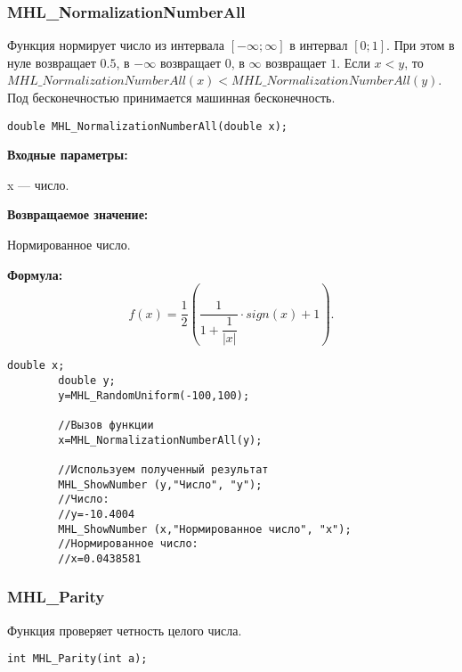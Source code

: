 \documentclass[a4paper,12pt]{article}
\begin{document}
\subsubsection{MHL\_NormalizationNumberAll}\label{MHL_NormalizationNumberAll}

Функция нормирует число из интервала $\left[-\infty;\infty \right] $ в интервал $\left[0;1\right]$. При этом в нуле возвращает $0.5$, в $-\infty$ возвращает $0$, в $\infty$ возвращает $1$. Если $x<y$, то $MHL\_NormalizationNumberAll(x)<MHL\_NormalizationNumberAll(y)$. Под бесконечностью принимается машинная бесконечность.


\begin{lstlisting}[label=code_syntax_MHL_NormalizationNumberAll,caption=Синтаксис]
double MHL_NormalizationNumberAll(double x);
\end{lstlisting}

\textbf{Входные параметры:}

 x --- число.

\textbf{Возвращаемое значение:}
 
Нормированное число.
 
\textbf{Формула:}
\begin{equation*}
f\left(x \right)=\frac{1}{2}\left( \dfrac{1}{1+\dfrac{1}{\left| x\right| }}\cdot sign \left( x\right)+1 \right) .
\end{equation*}


\begin{lstlisting}[label=code_use_MHL_NormalizationNumberAll,caption=Пример использования]
        double x;
        double y;
        y=MHL_RandomUniform(-100,100);

        //Вызов функции
        x=MHL_NormalizationNumberAll(y);

        //Используем полученный результат
        MHL_ShowNumber (y,"Число", "y");
        //Число:
        //y=-10.4004
        MHL_ShowNumber (x,"Нормированное число", "x");
        //Нормированное число:
        //x=0.0438581
\end{lstlisting}

\subsubsection{MHL\_Parity}\label{MHL_Parity}

Функция проверяет четность целого числа.


\begin{lstlisting}[label=code_syntax_MHL_Parity,caption=Синтаксис]
int MHL_Parity(int a);
\end{lstlisting}
\end{document}
